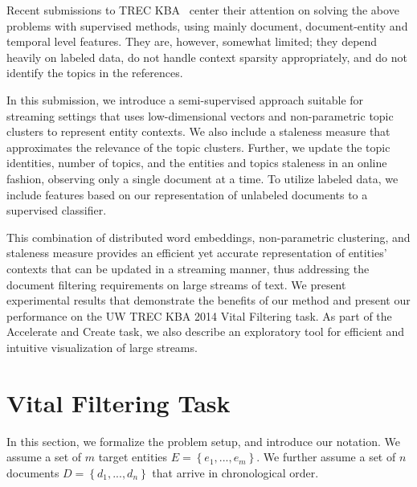\documentclass{article}
\begin{document}
Recent submissions to TREC KBA~\cite{xitong13, bouvier13, efron13, zhang13, bellogin13} center their attention on solving the above problems with supervised methods, using mainly document, document-entity and temporal level features.
They are, however, somewhat limited; they depend heavily on labeled data, do not handle context sparsity appropriately, and do not identify the topics in the references. %


In this submission, we introduce a semi-supervised approach suitable for streaming settings that uses low-dimensional vectors and non-parametric topic clusters to represent entity contexts. We also include a staleness measure that approximates the relevance of the topic clusters. %
Further, we update the topic identities, number of topics, and the entities and topics staleness in an online fashion, observing only a single document at a time.
To utilize labeled data, we include features based on our representation of unlabeled documents to a supervised classifier.

This combination of distributed word embeddings, non-parametric clustering, and staleness measure provides an efficient yet accurate representation of entities' contexts that can be updated in a streaming manner, thus addressing the document filtering requirements on large streams of text.
We present experimental results that demonstrate the benefits of our method and present our performance on the UW TREC KBA 2014 Vital Filtering task.
As part of the Accelerate and Create task, we also describe an exploratory tool for efficient and intuitive visualization of large streams.

\section{Vital Filtering Task}
\label{background}

In this section, we formalize the problem setup, and introduce our notation. 
We assume a set of $m$ target entities $E = \left\{ {e_1, ..., e_m}\right\}$. We further assume a set of $n$ documents $D = \left\{ {d_{1}, ..., d_{n}}\right\}$ that arrive in chronological order. 
 
\end{document}
